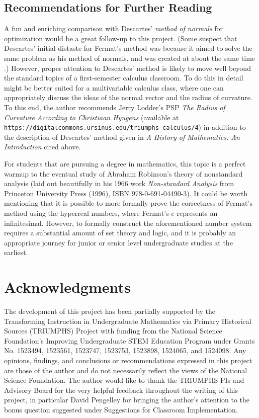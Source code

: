 \documentclass[11pt]{article}
\begin{document}
\subsection*{Recommendations for Further Reading}

A fun and enriching comparison with Descartes' \emph{method of normals} for optimization would be a great follow-up to this project.  (Some suspect that Descartes' initial distaste for Fermat's method was because it aimed to solve the same problem as his method of normals, and was created at about the same time \citep[pages 472 and 473]{Katz}.)   However, proper attention to Descartes' method is likely to move well beyond the standard topics of a first-semester calculus classroom.  To do this in detail might be better suited for a multivariable calculus class, where one can appropriately discuss the ideas of the normal vector and the radius of curvature.  To this end, the author recommends Jerry Lodder's PSP \emph{The Radius of Curvature According to Christiaan Hyugens} (available at {\tt https://digitalcommons.ursinus.edu/triumphs\_calculus/4}) in addition to the description of Descartes' method given in \emph{A History of Mathematics: An Introduction} \citep{Katz} cited above.

For students that are pursuing a degree in mathematics, this topic is a perfect warmup to the eventual study of Abraham Robinson's theory of nonstandard analysis (laid out beautifully in his 1966 work \emph{Non-standard Analysis} from Princeton University Press (1996), ISBN 978-0-691-04490-3).  It could be worth mentioning that it is possible to more formally prove the correctness of Fermat's method using the hyperreal numbers, where Fermat's $e$ represents an infinitesimal.  However, to formally construct the aforementioned number system requires a substantial amount of set theory and logic, and it is probably an appropriate journey for junior or senior level undergraduate studies at the earliest.    


 \section*{Acknowledgments}
The development of this project has been partially supported by the Transforming Instruction in
Undergraduate Mathematics via Primary Historical Sources (TRIUMPHS) Project with funding
from the National Science Foundation's Improving Undergraduate STEM Education Program under Grants No. 1523494, 1523561, 1523747, 1523753, 1523898, 1524065, and 1524098. Any opinions, findings, and conclusions or recommendations expressed in this project are those of the author and do not necessarily reflect the views of the National Science Foundation.  The author would like to thank the TRIUMPHS PIs and Advisory Board for the very helpful feedback throughout the writing of this project, in particular David Pengelley for bringing the author's attention to the bonus question suggested under Suggestions for Classroom Implementation.
\end{document}
